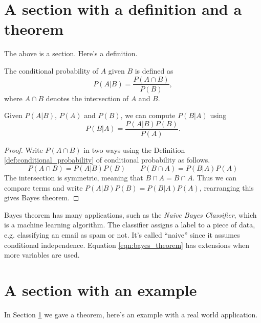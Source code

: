\label{chapter:basic_latex}

\blindtext

\section{A section with a definition and a theorem}
\label{sec:a_section_with_a_definition_and_a_theorem}

The above is a section. Here's a definition.

\begin{definition}
	\label{def:conditional_probability}
	The conditional probability of $A$ given $B$ is defined as
	\begin{equation*}
		P(A | B) = \frac{P(A \cap B)}{P(B)},
	\end{equation*}
	where $A \cap B$ denotes the intersection of $A$ and $B$.
\end{definition}

\begin{theorem}
	Given $P(A | B)$, $P(A)$ and $P(B)$, we can compute $P(B | A)$ using 
	\begin{equation}
	\label{eqn:bayes_theorem}
	P(B | A) = \frac{P(A | B) P(B)}{P(A)}.
	\end{equation}
\end{theorem}
\begin{proof}
	Write $P(A \cap B)$ in two ways using the Definition \ref{def:conditional_probability} of conditional probability as follows.
	\begin{equation*}
		P(A \cap B) = P(A | B) P(B) \qquad P(B \cap A) = P(B | A) P(A)
	\end{equation*}
	The intersection is symmetric, meaning that $B \cap A = B \cap A$.
	Thus we can compare terms and write $P(A | B) P(B) = P(B | A) P(A)$, rearranging this gives Bayes theorem.
\end{proof}

Bayes theorem has many applications, such as the \emph{Naive Bayes Classifier}, which is a machine learning algorithm.
The classifier assigns a label to a piece of data, e.g. classifying an email as spam or not.
It's called ``naive'' since it assumes conditional independence.
Equation \eqref{eqn:bayes_theorem} has extensions when more variables are used.

\section{A section with an example}
In Section \ref{sec:a_section_with_a_definition_and_a_theorem} we gave a theorem, here's an example with a real world application.

